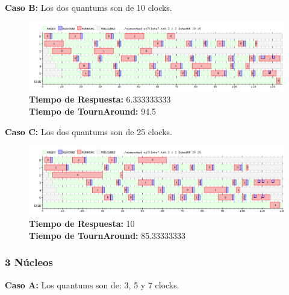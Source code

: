 \documentclass[a4paper]{article}
\begin{document}
	\textbf{Caso B:} Los dos quantums son de 10 clocks.

		 \begin{figure}[h!]
   \begin{center}
 	\includegraphics[scale=0.5]{imagenes/ej7/2nucleoB.png}
 	\textbf{Tiempo de Respuesta:} 6.333333333\\
 	\textbf{Tiempo de TournAround:} 94.5\\
   \end{center}
 \end{figure} 
 	
	\textbf{Caso C:} Los dos quantums son de 25 clocks.

		 \begin{figure}[h!]
   \begin{center}
 	\includegraphics[scale=0.5]{imagenes/ej7/2nucleoC.png}
 	\textbf{Tiempo de Respuesta:} 10 \\
 	\textbf{Tiempo de TournAround:} 85.33333333 \\
   \end{center}
 \end{figure} 
 
 \newpage
	\subsubsection*{3 N\'ucleos}
	
	\textbf{Caso A:} Los quantums son de: 3, 5 y 7 clocks.
\end{document}
